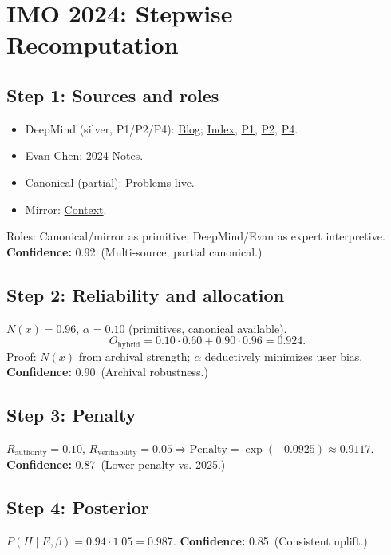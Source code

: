 \documentclass[11pt]{article}
\newcommand{\Nx}{N(x)}
\newcommand{\post}{P(H\mid E,\beta)}
\newcommand{\pen}{\mathrm{Penalty}}
\newcommand{\conf}[2]{\textbf{Confidence:} #1\ (#2)}
\begin{document}
\section{IMO 2024: Stepwise Recomputation}
\subsection*{Step 1: Sources and roles}
\begin{itemize}[leftmargin=1.35em]
  \item DeepMind (silver, P1/P2/P4): \href{https://deepmind.google/discover/blog/ai-solves-imo-problems-at-silver-medal-level/}{Blog}; \href{https://storage.googleapis.com/deepmind-media/DeepMind.com/Blog/imo-2024-solutions/index.html}{Index}, \href{https://storage.googleapis.com/deepmind-media/DeepMind.com/Blog/imo-2024-solutions/P1/index.html}{P1}, \href{https://storage.googleapis.com/deepmind-media/DeepMind.com/Blog/imo-2024-solutions/P2/index.html}{P2}, \href{https://storage.googleapis.com/deepmind-media/DeepMind.com/Blog/imo-2024-solutions/P4/index.html}{P4}.
  \item Evan Chen: \href{https://web.evanchen.cc/}{2024 Notes}.
  \item Canonical (partial): \href{https://imo-official.org/}{Problems live}.
  \item Mirror: \href{https://olympiads.win.tue.nl/imo}{Context}.
\end{itemize}
Roles: Canonical/mirror as primitive; DeepMind/Evan as expert interpretive.  
\conf{0.92}{Multi-source; partial canonical.}

\subsection*{Step 2: Reliability and allocation}
\(\Nx=0.96\), \(\alpha=0.10\) (primitives, canonical available).
\[
O_{\text{hybrid}} = 0.10 \cdot 0.60 + 0.90 \cdot 0.96 = 0.924.
\]
Proof: \(\Nx\) from archival strength; \(\alpha\) deductively minimizes user bias.  
\conf{0.90}{Archival robustness.}

\subsection*{Step 3: Penalty}
\(R_{\text{authority}}=0.10\), \(R_{\text{verifiability}}=0.05 \Rightarrow \pen = \exp(-0.0925) \approx 0.9117\).  
\conf{0.87}{Lower penalty vs. 2025.}

\subsection*{Step 4: Posterior}
\(\post=0.94 \cdot 1.05 = 0.987\).  
\conf{0.85}{Consistent uplift.}
\end{document}
